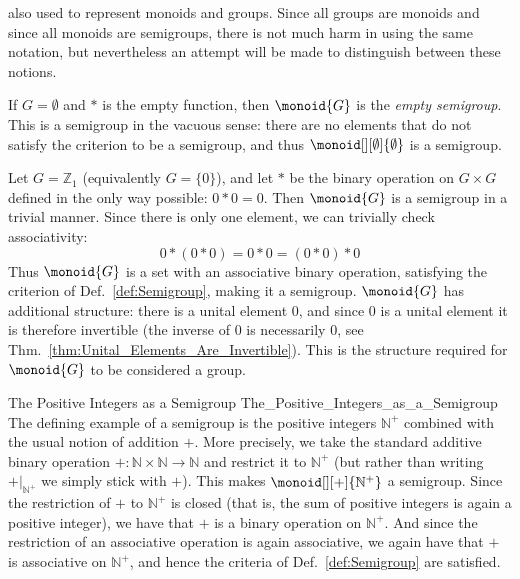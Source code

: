     also used to represent monoids and groups. Since all groups are monoids and
    since all monoids are semigroups, there is not much harm in using the same
    notation, but nevertheless an attempt will be made to distinguish between
    these notions.
    \begin{example}
        If $G=\emptyset$ and $*$ is the empty function, then $\monoid{G}$ is the
        \textit{empty semigroup}. This is a
        semigroup in the vacuous sense: there are no elements that do not
        satisfy the criterion to be a semigroup, and thus
        $\monoid[][\emptyset]{\emptyset}$ is a semigroup.
    \end{example}
    \begin{example}
        Let $G=\mathbb{Z}_{1}$ (equivalently $G=\{0\}$), and let
        $*$ be the binary operation on $G\times{G}$ defined in the only way
        possible: $0*0=0$. Then $\monoid{G}$ is a semigroup in a trivial manner.
        Since there is only one element, we can trivially check associativity:
        \begin{equation}
            0*(0*0)=0*0=(0*0)*0
        \end{equation}
        Thus $\monoid{G}$ is a set with an associative binary operation,
        satisfying the criterion of Def.~\ref{def:Semigroup}, making it a
        semigroup. $\monoid{G}$ has additional structure: there is a unital
        element 0, and since 0 is a unital element it is therefore invertible
        (the inverse of 0 is necessarily 0, see
        Thm.~\ref{thm:Unital_Elements_Are_Invertible}). This is the structure
        required for $\monoid{G}$ to be considered a group.
    \end{example}
    \begin{fexample}{The Positive Integers as a Semigroup}
                    {The_Positive_Integers_as_a_Semigroup}
        The defining example of a semigroup is the positive integers
        $\mathbb{N}^{+}$ combined with the usual notion of addition $+$. More
        precisely, we take the standard additive binary operation
        $+:\mathbb{N}\times\mathbb{N}\rightarrow\mathbb{N}$ and restrict it to
        $\mathbb{N}^{+}$ (but rather than writing $+|_{\mathbb{N}^{+}}$ we
        simply stick with $+$). This makes $\monoid[][+]{\mathbb{N}^{+}}$ a
        semigroup. Since the restriction of $+$ to $\mathbb{N}^{+}$ is closed
        (that is, the sum of positive integers is again a positive integer), we
        have that $+$ is a binary operation on $\mathbb{N}^{+}$. And since the
        restriction of an associative operation is again associative, we again
        have that $+$ is associative on $\mathbb{N}^{+}$, and hence the criteria
        of Def.~\ref{def:Semigroup} are satisfied.
    \end{fexample}
